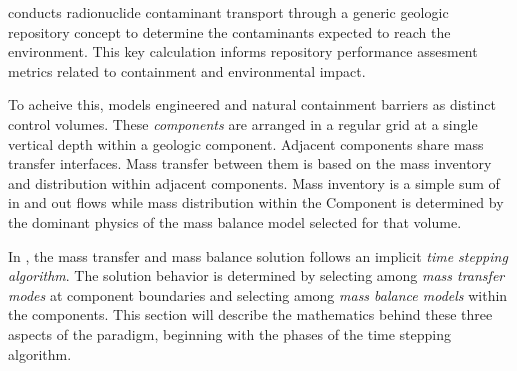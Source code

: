 \Cyder conducts radionuclide contaminant transport through a generic geologic 
repository concept to determine the 
contaminants expected to reach the environment. This key calculation 
informs repository performance assesment metrics related to containment and 
environmental impact.

To acheive this, \Cyder models engineered and natural containment barriers as 
distinct control volumes. These \emph{components} are arranged in a regular 
grid at a single vertical depth within a geologic component. Adjacent 
components share mass transfer interfaces. Mass transfer between them is based 
on the mass inventory and distribution within adjacent components. Mass 
inventory is a simple sum of in and out flows while mass distribution within 
the Component is determined by the dominant physics of the mass balance model 
selected for that volume.

In \Cyder, the mass transfer and mass balance solution follows an implicit 
\emph{time stepping algorithm}. The solution behavior is determined by selecting 
among \emph{mass transfer modes} at component boundaries and selecting among 
\emph{mass balance models} within the components. This section will describe 
the mathematics behind these three aspects of the \Cyder paradigm, beginning 
with the phases of the time stepping algorithm.
